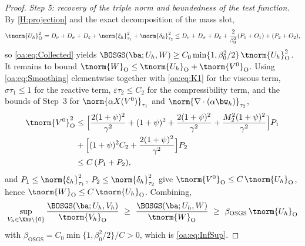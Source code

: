 \begin{proof}
\medskip\noindent\emph{Step 5: recovery of the triple norm and boundedness of the test
function.}
By \cref{H:projection} and the exact decomposition of the mass slot,
\[
  \tnorm{U_h}_{\mathrm{O}}^2
  = D_\nu + D_\sigma + D_\varepsilon + \norm{\xi_h}_{\tau_1}^2 + \norm{\delta_h}_{\tau_2}^2
  \le D_\nu + D_\sigma + D_\varepsilon + \frac{2}{\beta_0^2}(P_1 + O_1) + (P_2 + O_2),
\]
so \cref{oa:eq:Collected} yields
$\BOSGS(\ba; U_h, W) \ge C_0 \min\{1, \beta_0^2/2\}\,\tnorm{U_h}_{\mathrm{O}}^2$.
It remains to bound $\tnorm{W}_{\mathrm{O}} \le \tnorm{U_h}_{\mathrm{O}} + \tnorm{V^0}_{\mathrm{O}}$. Using
\cref{oa:eq:Smoothing} elementwise together with \cref{oa:eq:K1} for the viscous term,
$\sigma\tau_1 \le 1$ for the reactive term, $\varepsilon\tau_2 \le C_2$ for the
compressibility term, and the bounds of Step~3 for
$\norm{\alpha X(V^0)}_{\tau_1}$ and $\norm{\nabla\cdot(\alpha\bw_h)}_{\tau_2}$,
\begin{align*}
  \tnorm{V^0}_{\mathrm{O}}^2
  &\le \Bigl[ \frac{2(1+\psi)^2}{\gamma^2}
  + (1+\psi)^2
  + \frac{2(1+\psi)^2}{\gamma^2}
  + \frac{M_2^2(1+\psi)^2}{\gamma^2} \Bigr] P_1 \\
  &+ \Bigl[ (1+\psi)^2 C_2 + \frac{2(1+\psi)^2}{\gamma^2} \Bigr] P_2\\
  &\le C\,(P_1 + P_2),
\end{align*}
and $P_1 \le \norm{\xi_h}_{\tau_1}^2$, $P_2 \le \norm{\delta_h}_{\tau_2}^2$ give
$\tnorm{V^0}_{\mathrm{O}} \le C\,\tnorm{U_h}_{\mathrm{O}}$, hence $\tnorm{W}_{\mathrm{O}} \le C\,\tnorm{U_h}_{\mathrm{O}}$. Combining,
\[
  \sup_{V_h\in\Xhz\setminus\{0\}} \frac{\BOSGS(\ba; U_h, V_h)}{\tnorm{V_h}_{\mathrm{O}}}
  \ \ge\ \frac{\BOSGS(\ba; U_h, W)}{\tnorm{W}_{\mathrm{O}}}
  \ \ge\ \beta_{\mathrm{OSGS}}\, \tnorm{U_h}_{\mathrm{O}}
\]
with $\beta_{\mathrm{OSGS}} = C_0\min\{1,\beta_0^2/2\}/C > 0$, which is
\cref{oa:eq:InfSup}.
\end{proof}

